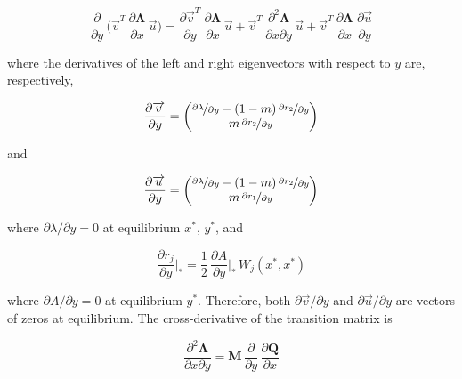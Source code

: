 \begin{equation}
    \frac{\partial}{\partial y}\,\bigg(\overrightarrow{v}^T\,\frac{\partial \pmb \Lambda}{\partial x}\,\overrightarrow{u}\bigg) = \frac{\partial \overrightarrow{v}^T}{\partial y}\,\frac{\partial \pmb \Lambda}{\partial x}\,\overrightarrow{u}+\overrightarrow{v}^T\,\frac{\partial^2 \pmb \Lambda}{\partial x \partial y}\,\overrightarrow{u}+\overrightarrow{v}^T\,\frac{\partial \pmb \Lambda}{\partial x}\,\frac{\partial \overrightarrow{u}}{\partial y}   
    \label{eq:deriv_lambda_x_y}
\end{equation}

where the derivatives of the left and right eigenvectors with respect to $y$ are, respectively,

\begin{equation}
    \frac{\partial \overrightarrow{v}}{\partial y} =
    \begin{pmatrix}
        \nicefrac{\partial \lambda}{\partial y} - (1-m)\,\nicefrac{\partial r_2}{\partial y}\\
        m \,\nicefrac{\partial r_2}{\partial y}
    \end{pmatrix}
\end{equation}

and

\begin{equation}
    \frac{\partial \overrightarrow{u}}{\partial y} =
    \begin{pmatrix}
        \nicefrac{\partial \lambda}{\partial y} - (1-m)\,\nicefrac{\partial r_2}{\partial y}\\
        m \,\nicefrac{\partial r_1}{\partial y}
    \end{pmatrix}
\end{equation}

where $\partial \lambda / \partial y = 0$ at equilibrium $x^*$, $y^*$, and

\begin{equation}
    \frac{\partial r_j}{\partial y}\bigg|_* = \frac{1}{2} \, \frac{\partial A}{\partial y}\bigg|_*\,W_j(x^*,x^*)
\end{equation}

where $\partial A / \partial y = 0$ at equilibrium $y^*$. Therefore, both $\partial \overrightarrow{v} / \partial y$ and $\partial \overrightarrow{u} / \partial y$ are vectors of zeros at equilibrium. The cross-derivative of the transition matrix is

\begin{equation}
    \frac{\partial^2 \pmb \Lambda}{\partial x \partial y} = \pmb M \, \frac{\partial}{\partial y}\,\frac{\partial \pmb Q}{\partial x}
\end{equation}

